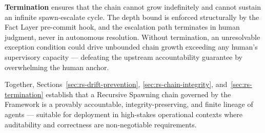 \medskip
\textbf{Termination} ensures that the chain cannot grow indefinitely and cannot sustain an infinite spawn-escalate cycle. The depth bound is enforced structurally by the Fact Layer pre-commit hook, and the escalation path terminates in human judgment, never in autonomous resolution. Without termination, an unresolvable exception condition could drive unbounded chain growth exceeding any human's supervisory capacity — defeating the upstream \bxthree{} accountability guarantee by overwhelming the human anchor.

Together, Sections~\ref{sec:rs-drift-prevention}, \ref{sec:rs-chain-integrity}, and~\ref{sec:rs-termination} establish that a Recursive Spawning chain governed by the \bxthree{} Framework is a provably accountable, integrity-preserving, and finite lineage of agents — suitable for deployment in high-stakes operational contexts where auditability and correctness are non-negotiable requirements.
